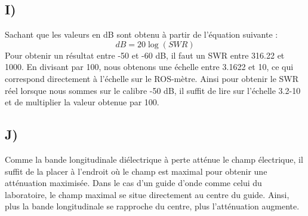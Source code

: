 \subsection{I)}
Sachant que les valeurs en dB sont obtenu à partir de l'équation suivante :
\begin{equation}
	dB = 20\log(SWR)
\end{equation}
Pour obtenir un résultat entre -50 et -60 dB, il faut un SWR entre 316.22 et 1000. En divisant par 100, nous obtenons une échelle entre 3.1622 et 10, ce qui correspond directement à l'échelle sur le ROS-mètre. Ainsi pour obtenir le SWR réel lorsque nous sommes sur le calibre -50 dB, il suffit de lire sur l'échelle 3.2-10 et de multiplier la valeur obtenue par 100.

\subsection{J)}
Comme la bande longitudinale diélectrique à perte atténue le champ électrique, il suffit de la placer à l'endroit où le champ est maximal pour obtenir une atténuation maximisée. Dans le cas d'un guide d'onde comme celui du laboratoire, le champ maximal se situe directement au centre du guide. Ainsi, plus la bande longitudinale se rapproche du centre, plus l'atténuation augmente.